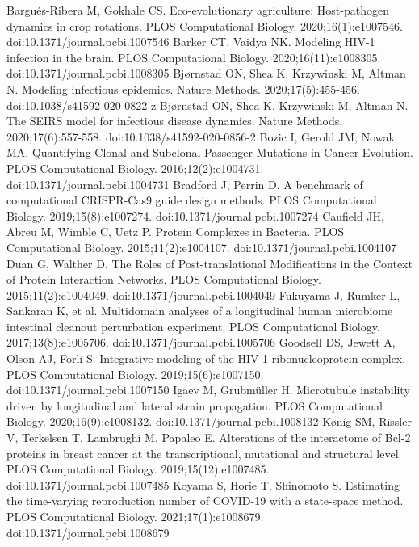 \documentclass [11pt]{article}
\begin{document}
\newpage
\begin{thebibliography}{99}
Bargués-Ribera M, Gokhale CS. Eco-evolutionary agriculture: Host-pathogen dynamics in crop rotations. PLOS Computational Biology. 2020;16(1):e1007546. doi:10.1371/journal.pcbi.1007546
Barker CT, Vaidya NK. Modeling HIV-1 infection in the brain. PLOS Computational Biology. 2020;16(11):e1008305. doi:10.1371/journal.pcbi.1008305
Bjørnstad ON, Shea K, Krzywinski M, Altman N. Modeling infectious epidemics. Nature Methods. 2020;17(5):455-456. doi:10.1038/s41592-020-0822-z
Bjørnstad ON, Shea K, Krzywinski M, Altman N. The SEIRS model for infectious disease dynamics. Nature Methods. 2020;17(6):557-558. doi:10.1038/s41592-020-0856-2
Bozic I, Gerold JM, Nowak MA. Quantifying Clonal and Subclonal Passenger Mutations in Cancer Evolution. PLOS Computational Biology. 2016;12(2):e1004731. doi:10.1371/journal.pcbi.1004731
Bradford J, Perrin D. A benchmark of computational CRISPR-Cas9 guide design methods. PLOS Computational Biology. 2019;15(8):e1007274. doi:10.1371/journal.pcbi.1007274
Caufield JH, Abreu M, Wimble C, Uetz P. Protein Complexes in Bacteria. PLOS Computational Biology. 2015;11(2):e1004107. doi:10.1371/journal.pcbi.1004107
Duan G, Walther D. The Roles of Post-translational Modifications in the Context of Protein Interaction Networks. PLOS Computational Biology. 2015;11(2):e1004049. doi:10.1371/journal.pcbi.1004049
Fukuyama J, Rumker L, Sankaran K, et al. Multidomain analyses of a longitudinal human microbiome intestinal cleanout perturbation experiment. PLOS Computational Biology. 2017;13(8):e1005706. doi:10.1371/journal.pcbi.1005706
Goodsell DS, Jewett A, Olson AJ, Forli S. Integrative modeling of the HIV-1 ribonucleoprotein complex. PLOS Computational Biology. 2019;15(6):e1007150. doi:10.1371/journal.pcbi.1007150
Igaev M, Grubmüller H. Microtubule instability driven by longitudinal and lateral strain propagation. PLOS Computational Biology. 2020;16(9):e1008132. doi:10.1371/journal.pcbi.1008132
Kønig SM, Rissler V, Terkelsen T, Lambrughi M, Papaleo E. Alterations of the interactome of Bcl-2 proteins in breast cancer at the transcriptional, mutational and structural level. PLOS Computational Biology. 2019;15(12):e1007485. doi:10.1371/journal.pcbi.1007485
Koyama S, Horie T, Shinomoto S. Estimating the time-varying reproduction number of COVID-19 with a state-space method. PLOS Computational Biology. 2021;17(1):e1008679. doi:10.1371/journal.pcbi.1008679

\end{thebibliography}
\end{document}
